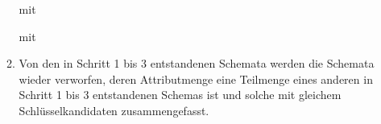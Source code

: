 \documentclass{lehramt-informatik-aufgabe}
\begin{document}
\begin{enumerate}
\begin{liAntwort}
\begin{enumerate}
 mit 

\bigskip

 mit \FA[$F_{22}$]{}

\item {}

Von den in Schritt 1 bis 3 entstandenen Schemata werden die Schemata
wieder verworfen, deren Attributmenge eine Teilmenge eines anderen in
Schritt 1 bis 3 entstandenen Schemas ist und solche mit gleichem
Schlüsselkandidaten zusammengefasst.

\end{enumerate}
\end{liAntwort}

\end{enumerate}
\end{document}

